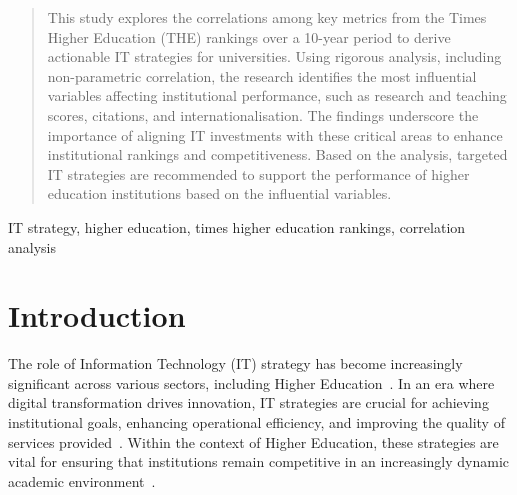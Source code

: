 \documentclass[conference]{IEEEtran}
\begin{document}
\newcommand{\al}[1]{{\textbf{\color{blue} Al: #1}}}



\IEEEoverridecommandlockouts

\maketitle

\IEEEpubidadjcol


\begin{abstract}
	This study explores the correlations among key metrics from the Times Higher Education (THE) rankings over a 10-year period to derive actionable IT strategies for universities. Using rigorous analysis, including non-parametric correlation, the research identifies the most influential variables affecting institutional performance, such as research and teaching scores, citations, and internationalisation. The findings underscore the importance of aligning IT investments with these critical areas to enhance institutional rankings and competitiveness. Based on the analysis, targeted IT strategies are recommended to support the performance of higher education institutions based on the influential variables.
\end{abstract}

\begin{IEEEkeywords}
	IT strategy, higher education, times higher education rankings, correlation analysis
\end{IEEEkeywords}


\section{Introduction}


The role of Information Technology (IT) strategy has become increasingly significant across various sectors, including Higher Education~\cite{hashim2021higher}. In an era where digital transformation drives innovation, IT strategies are crucial for achieving institutional goals, enhancing operational efficiency, and improving the quality of services provided~\cite{rahmadi2024research}. Within the context of Higher Education, these strategies are vital for ensuring that institutions remain competitive in an increasingly dynamic academic environment~\cite{fernandez2023digital}.
\end{document}
